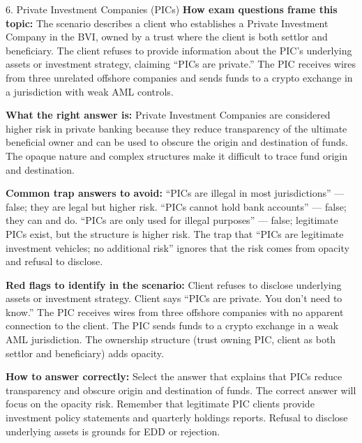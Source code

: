 \documentclass[11pt,a4paper]{beamer}
\begin{document}
	\begin{frame}{6. Private Investment Companies (PICs)}
		\tiny
		\noindent\textbf{How exam questions frame this topic:} The scenario describes a client who establishes a Private Investment Company in the BVI, owned by a trust where the client is both settlor and beneficiary. The client refuses to provide information about the PIC's underlying assets or investment strategy, claiming “PICs are private.” The PIC receives wires from three unrelated offshore companies and sends funds to a crypto exchange in a jurisdiction with weak AML controls.
		
		\vspace{0.1cm}
		\noindent\textbf{What the right answer is:} Private Investment Companies are considered higher risk in private banking because they reduce transparency of the ultimate beneficial owner and can be used to obscure the origin and destination of funds. The opaque nature and complex structures make it difficult to trace fund origin and destination.
		
		\vspace{0.1cm}
		\noindent\textbf{Common trap answers to avoid:} “PICs are illegal in most jurisdictions” — false; they are legal but higher risk. “PICs cannot hold bank accounts” — false; they can and do. “PICs are only used for illegal purposes” — false; legitimate PICs exist, but the structure is higher risk. The trap that “PICs are legitimate investment vehicles; no additional risk” ignores that the risk comes from opacity and refusal to disclose.
		
		\vspace{0.1cm}
		\noindent\textbf{Red flags to identify in the scenario:} Client refuses to disclose underlying assets or investment strategy. Client says “PICs are private. You don't need to know.” The PIC receives wires from three offshore companies with no apparent connection to the client. The PIC sends funds to a crypto exchange in a weak AML jurisdiction. The ownership structure (trust owning PIC, client as both settlor and beneficiary) adds opacity.
		
		\vspace{0.1cm}
		\noindent\textbf{How to answer correctly:} Select the answer that explains that PICs reduce transparency and obscure origin and destination of funds. The correct answer will focus on the opacity risk. Remember that legitimate PIC clients provide investment policy statements and quarterly holdings reports. Refusal to disclose underlying assets is grounds for EDD or rejection.
	\end{frame}
	
\end{document}
